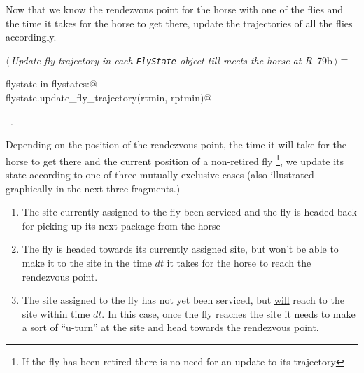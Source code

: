 \documentclass[11.5pt]{report}
\begin{document}
\vspace{-0.8cm} \newchunk
Now that we know the rendezvous point for the horse with one of the flies and the time it takes
for the horse to get there, update the trajectories of all the flies accordingly. 
\begin{flushleft} \small
\begin{minipage}{\linewidth}\label{scrap120}\raggedright\small
{} $\langle\,${\itshape Update fly trajectory in each \verb|FlyState| object till  meets the horse at $R$}\nobreak\ {\footnotesize {79b}}$\,\rangle\equiv$
\vspace{-1ex}
\begin{list}{}{} \item
\mbox{}\verb@for flystate in flystates:@\\
\mbox{}\verb@    flystate.update_fly_trajectory(rtmin, rptmin)@\\
\mbox{}\verb@@{\NWsep}
\end{list}
\vspace{-1.5ex}
\footnotesize
\begin{list}{}{\setlength{\itemsep}{-\parsep}\setlength{\itemindent}{-\leftmargin}}
\item \NWtxtMacroRefIn\ .

\item{}
\end{list}
\end{minipage}\vspace{4ex}
\end{flushleft}


\vspace{-0.8cm} \newchunk Depending on the position of the rendezvous point, the time it will take for the horse
to get there and the current position of a non-retired fly \footnote{If the fly has been retired there is no need 
for an update to its trajectory}, we update its state according to one of three mutually exclusive cases (also 
illustrated graphically in the next three fragments.)

\begin{enumerate}
 \item The site currently assigned to the fly been serviced and the fly is headed back for picking up 
       its next package from the horse
 \item The fly is headed towards its currently assigned site, but won't be able to make it to the site in 
       the time $dt$ it takes for the horse to reach the rendezvous point. 
 \item The site assigned to the fly has not yet been serviced, but \underline{will} reach
       to the site within time $dt$. In this case, once the fly reaches the site it needs to make 
       a sort of ``u-turn'' at the site and head towards the rendezvous point. 
\end{enumerate}
\end{document}
